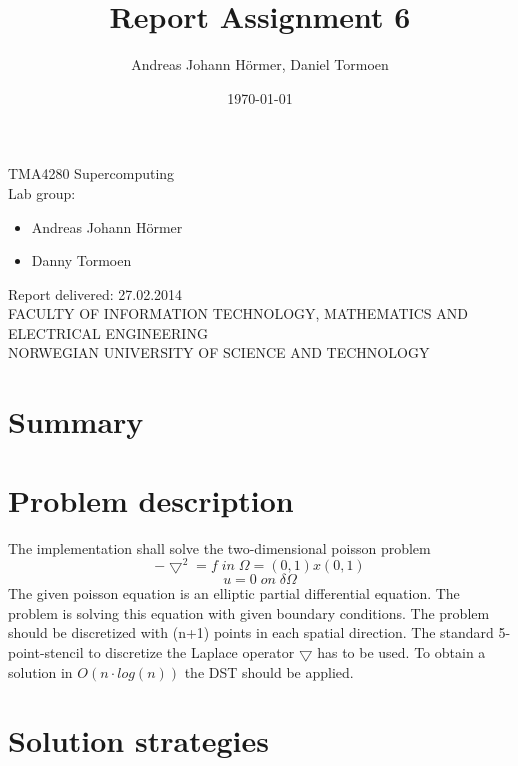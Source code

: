 \documentclass{article}
\title{Report Assignment 6}
\author{Andreas Johann H\"ormer, Daniel Tormoen}
\date{\today}
\begin{document}
\thispagestyle{empty}
\maketitle
\thispagestyle{empty}
\begin{center}
TMA4280 Supercomputing\\[3cm]
Lab group:
\begin{itemize}
\item Andreas Johann H\"ormer
\item Danny Tormoen\\[3cm]
\end{itemize}
Report delivered: 27.02.2014\\[6cm]
FACULTY OF INFORMATION TECHNOLOGY, MATHEMATICS AND ELECTRICAL ENGINEERING\\
NORWEGIAN UNIVERSITY OF SCIENCE AND TECHNOLOGY
\end{center}
\thispagestyle{empty}
\newpage
\tableofcontents
\thispagestyle{empty}
\newpage
\section*{Summary}
\thispagestyle{empty}

\newpage
\setcounter{page}{1}
\section{Problem description}
The implementation shall solve the two-dimensional poisson problem 
\begin{equation}
-\bigtriangledown^2=f\;in\;\Omega = (0,1)x(0,1)
\end{equation}
\begin{equation}
u = 0\;on\;\delta\Omega
\end{equation}
The given poisson equation is an elliptic partial differential equation. The problem is solving this equation with given boundary conditions. 
The problem should be discretized with (n+1) points in each spatial direction. The standard 5-point-stencil to discretize the Laplace operator $\bigtriangledown$ has to be used. To obtain a solution in $O(n\cdot log(n))$ the DST should be applied.
\section{Solution strategies}
\end{document}
